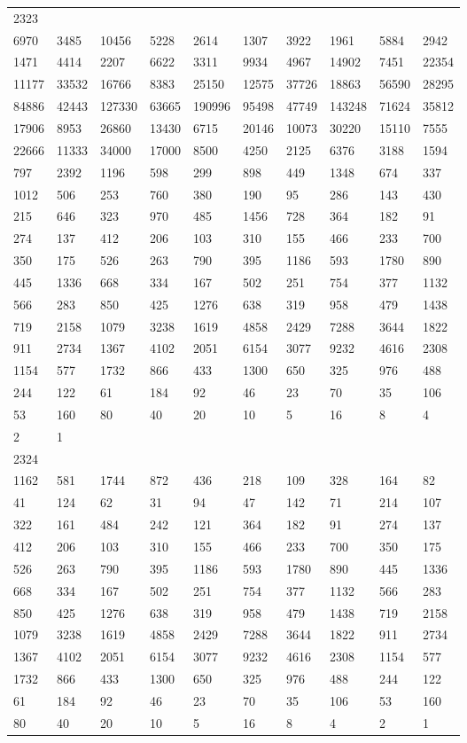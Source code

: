 \begin{longtable}{*{10}{l}}
2323&&&&&&&&&\\
6970& 3485& 10456& 5228& 2614& 1307& 3922& 1961& 5884& 2942\\
1471& 4414& 2207& 6622& 3311& 9934& 4967& 14902& 7451& 22354\\
11177& 33532& 16766& 8383& 25150& 12575& 37726& 18863& 56590& 28295\\
84886& 42443& 127330& 63665& 190996& 95498& 47749& 143248& 71624& 35812\\
17906& 8953& 26860& 13430& 6715& 20146& 10073& 30220& 15110& 7555\\
22666& 11333& 34000& 17000& 8500& 4250& 2125& 6376& 3188& 1594\\
797& 2392& 1196& 598& 299& 898& 449& 1348& 674& 337\\
1012& 506& 253& 760& 380& 190& 95& 286& 143& 430\\
215& 646& 323& 970& 485& 1456& 728& 364& 182& 91\\
274& 137& 412& 206& 103& 310& 155& 466& 233& 700\\
350& 175& 526& 263& 790& 395& 1186& 593& 1780& 890\\
445& 1336& 668& 334& 167& 502& 251& 754& 377& 1132\\
566& 283& 850& 425& 1276& 638& 319& 958& 479& 1438\\
719& 2158& 1079& 3238& 1619& 4858& 2429& 7288& 3644& 1822\\
911& 2734& 1367& 4102& 2051& 6154& 3077& 9232& 4616& 2308\\
1154& 577& 1732& 866& 433& 1300& 650& 325& 976& 488\\
244& 122& 61& 184& 92& 46& 23& 70& 35& 106\\
53& 160& 80& 40& 20& 10& 5& 16& 8& 4\\
2& 1& \\

2324&&&&&&&&&\\
1162& 581& 1744& 872& 436& 218& 109& 328& 164& 82\\
41& 124& 62& 31& 94& 47& 142& 71& 214& 107\\
322& 161& 484& 242& 121& 364& 182& 91& 274& 137\\
412& 206& 103& 310& 155& 466& 233& 700& 350& 175\\
526& 263& 790& 395& 1186& 593& 1780& 890& 445& 1336\\
668& 334& 167& 502& 251& 754& 377& 1132& 566& 283\\
850& 425& 1276& 638& 319& 958& 479& 1438& 719& 2158\\
1079& 3238& 1619& 4858& 2429& 7288& 3644& 1822& 911& 2734\\
1367& 4102& 2051& 6154& 3077& 9232& 4616& 2308& 1154& 577\\
1732& 866& 433& 1300& 650& 325& 976& 488& 244& 122\\
61& 184& 92& 46& 23& 70& 35& 106& 53& 160\\
80& 40& 20& 10& 5& 16& 8& 4& 2& 1\\


\end{longtable}
